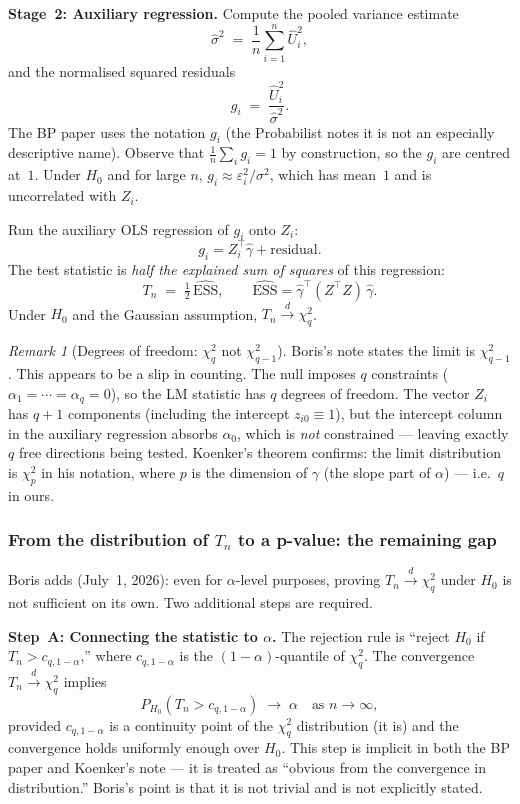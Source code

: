 \documentclass[a4paper,oneside,12pt]{extarticle}
\theoremstyle{plain}
\theoremstyle{definition}
\theoremstyle{remark}
\newtheorem{remark}[proposition]{Remark}
\begin{document}
\textbf{Stage~2: Auxiliary regression.}  Compute the pooled variance
estimate
\[
  \hat\sigma^2 \;=\; \frac{1}{n}\sum_{i=1}^n \hat U_i^2,
\]
and the normalised squared residuals
\[
  g_i \;=\; \frac{\hat U_i^2}{\hat\sigma^2}.
\]
The BP paper uses the notation $g_i$ (the Probabilist notes it is not an
especially descriptive name).  Observe that $\frac{1}{n}\sum_i g_i = 1$
by construction, so the $g_i$ are centred at~$1$.  Under $H_0$ and for
large $n$, $g_i \approx \varepsilon_i^2/\sigma^2$, which has mean~$1$
and is uncorrelated with $Z_i$.

Run the auxiliary OLS regression of $g_i$ onto $Z_i$:
\[
  g_i = Z_i^\top \hat\gamma + \text{residual}.
\]
The test statistic is \emph{half the explained sum of squares} of this
regression:
\[
  T_n \;=\; \tfrac{1}{2}\,\widehat{\mathrm{ESS}},
  \qquad
  \widehat{\mathrm{ESS}} = \hat\gamma^\top (Z^\top Z)\,\hat\gamma.
\]
Under $H_0$ and the Gaussian assumption, $T_n \xrightarrow{d} \chi^2_q$.

\begin{remark}[Degrees of freedom: $\chi^2_q$ not $\chi^2_{q-1}$]
Boris's note states the limit is $\chi^2_{q-1}$. This appears to be a
slip in counting.  The null imposes $q$ constraints
($\alpha_1 = \cdots = \alpha_q = 0$), so the LM statistic has $q$
degrees of freedom.  The vector $Z_i$ has $q+1$ components (including
the intercept $z_{i0} \equiv 1$), but the intercept column in the
auxiliary regression absorbs $\alpha_0$, which is \emph{not}
constrained — leaving exactly $q$ free directions being tested.
Koenker's theorem confirms: the limit distribution is $\chi^2_p$ in his
notation, where $p$ is the dimension of $\gamma$ (the slope part of
$\alpha$) — i.e.\ $q$ in ours.
\end{remark}

\subsubsection*{From the distribution of $T_n$ to a p-value: the remaining gap}

Boris adds (July~1, 2026): even for $\alpha$-level purposes, proving
$T_n \xrightarrow{d} \chi^2_q$ under $H_0$ is not sufficient on its
own.  Two additional steps are required.

\textbf{Step~A: Connecting the statistic to $\alpha$.}  The rejection
rule is ``reject $H_0$ if $T_n > c_{q,1-\alpha}$,'' where
$c_{q,1-\alpha}$ is the $(1-\alpha)$-quantile of $\chi^2_q$.  The
convergence $T_n \xrightarrow{d} \chi^2_q$ implies
\[
  P_{H_0}(T_n > c_{q,1-\alpha}) \;\to\; \alpha
  \quad \text{as } n \to \infty,
\]
provided $c_{q,1-\alpha}$ is a continuity point of the $\chi^2_q$
distribution (it is) and the convergence holds uniformly enough over
$H_0$.  This step is implicit in both the BP paper and Koenker's note
— it is treated as ``obvious from the convergence in distribution.''
Boris's point is that it is not trivial and is not explicitly stated.
\end{document}
